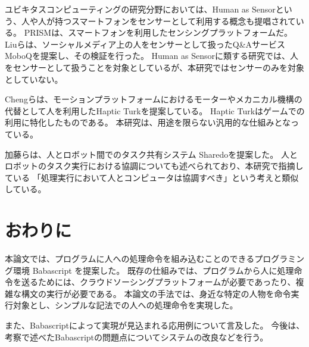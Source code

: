 \documentclass[twoside]{wiss}
\begin{document}
ユビキタスコンピューティングの研究分野においては、Human as Sensorという、人や人が持つスマートフォンをセンサーとして利用する概念も提唱されている。
PRISMは、スマートフォンを利用したセンシングプラットフォームだ\cite{prism}。
Liuらは、ソーシャルメディア上の人をセンサーとして扱ったQ\&AサービスMoboQを提案し、その検証を行った。
Human as Sensorに類する研究では、人をセンサーとして扱うことを対象としているが、本研究ではセンサーのみを対象としていない。

Chengらは、モーションプラットフォームにおけるモーターやメカニカル機構の代替として人を利用したHaptic Turkを提案している\cite{hapticturk}。
Haptic Turkはゲームでの利用に特化したものである。
本研究は、用途を限らない汎用的な仕組みとなっている。

加藤らは、人とロボット間でのタスク共有システム Sharedoを提案した\cite{sharedo}。
人とロボットのタスク実行における協調についても述べられており、本研究で指摘している
「処理実行において人とコンピュータは協調すべき」という考えと類似している。

\section{おわりに}

本論文では、プログラムに人への処理命令を組み込むことのできるプログラミング環境 Babascript を提案した。
既存の仕組みでは、プログラムから人に処理命令を送るためには、クラウドソーシングプラットフォームが必要であったり、複雑な構文の実行が必要である。
本論文の手法では、身近な特定の人物を命令実行対象とし、シンプルな記法での人への処理命令を実現した。

また、Babascriptによって実現が見込まれる応用例について言及した。
今後は、考察で述べたBabascriptの問題点についてシステムの改良などを行う。

{\scriptsize


}
\end{document}
